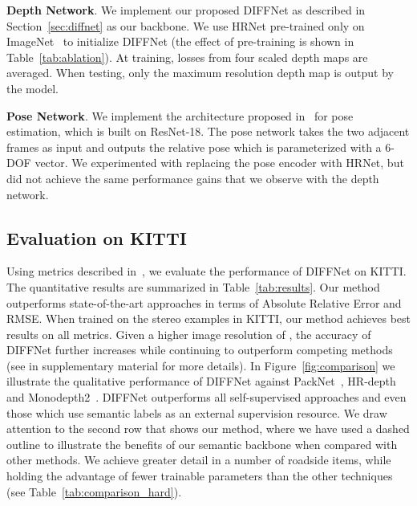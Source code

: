 \documentclass{bmvc2k}
\begin{document}
\textbf{Depth Network}. We implement our proposed DIFFNet as described in Section~\ref{sec:diffnet} as our backbone. We use HRNet pre-trained only on ImageNet~\cite{imagenet} to initialize DIFFNet (the effect of pre-training is shown in Table~\ref{tab:ablation}). At training, losses from four scaled depth maps are averaged. When testing, only the maximum resolution depth map is output by the model.


\textbf{Pose Network}. We implement the architecture proposed in~\cite{monodepth2} for pose estimation, which is built on ResNet-18. The pose network takes the two adjacent frames as input and outputs the relative pose which is parameterized with a 6-DOF vector. We experimented with replacing the pose encoder with HRNet, but did not achieve the same performance gains that we observe with the depth network.
\subsection{Evaluation on KITTI}
Using metrics described in~\cite{Eigen2014}, we evaluate the performance of DIFFNet on KITTI. The quantitative results are summarized in Table~\ref{tab:results}. Our method outperforms state-of-the-art approaches in terms of Absolute Relative Error and RMSE. When trained on the stereo examples in KITTI, our method achieves best results on all metrics. Given a higher image resolution of , the accuracy of DIFFNet further increases while continuing to outperform competing methods (see in supplementary material for more details).
In Figure~\ref{fig:comparison} we illustrate the qualitative performance of DIFFNet against PackNet~\cite{guizilini2020}, HR-depth~\cite{lyu2020hr} and Monodepth2~\cite{monodepth2}. 
DIFFNet outperforms all self-supervised approaches and even those which use semantic labels as an external supervision resource. We draw attention to the second row that shows our method, where we have used a dashed outline to illustrate the benefits of our semantic backbone when compared with other methods.
We achieve greater detail in a number of roadside items, while holding the advantage of fewer trainable parameters than the other techniques (see Table~\ref{tab:comparison_hard}).
\end{document}
